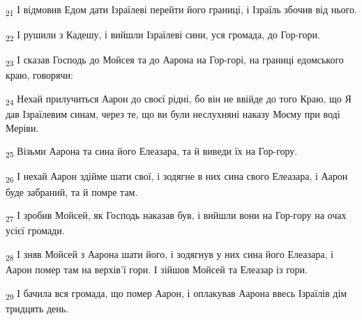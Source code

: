 \begin{tcolorbox}
\textsubscript{21} І відмовив Едом дати Ізраїлеві перейти його границі, і Ізраїль збочив від нього.
\end{tcolorbox}
\begin{tcolorbox}
\textsubscript{22} І рушили з Кадешу, і вийшли Ізраїлеві сини, уся громада, до Гор-гори.
\end{tcolorbox}
\begin{tcolorbox}
\textsubscript{23} І сказав Господь до Мойсея та до Аарона на Гор-горі, на границі едомського краю, говорячи:
\end{tcolorbox}
\begin{tcolorbox}
\textsubscript{24} Нехай прилучиться Аарон до своєї рідні, бо він не ввійде до того Краю, що Я дав Ізраїлевим синам, через те, що ви були неслухняні наказу Моєму при воді Меріви.
\end{tcolorbox}
\begin{tcolorbox}
\textsubscript{25} Візьми Аарона та сина його Елеазара, та й виведи їх на Гор-гору.
\end{tcolorbox}
\begin{tcolorbox}
\textsubscript{26} І нехай Аарон здійме шати свої, і зодягне в них сина свого Елеазара, і Аарон буде забраний, та й помре там.
\end{tcolorbox}
\begin{tcolorbox}
\textsubscript{27} І зробив Мойсей, як Господь наказав був, і вийшли вони на Гор-гору на очах усієї громади.
\end{tcolorbox}
\begin{tcolorbox}
\textsubscript{28} І зняв Мойсей з Аарона шати його, і зодягнув у них сина його Елеазара, і Аарон помер там на верхів'ї гори. І зійшов Мойсей та Елеазар із гори.
\end{tcolorbox}
\begin{tcolorbox}
\textsubscript{29} І бачила вся громада, що помер Аарон, і оплакував Аарона ввесь Ізраїлів дім тридцять день.
\end{tcolorbox}
